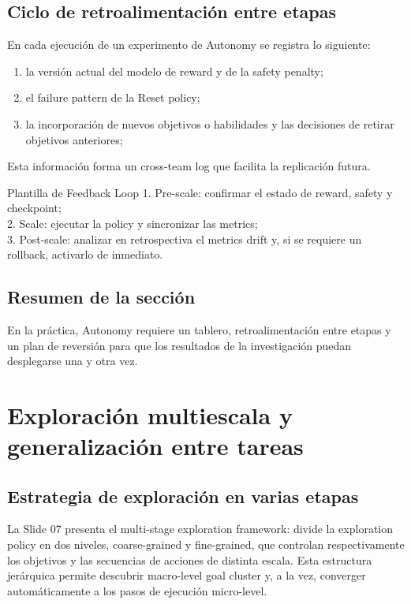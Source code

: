\documentclass[a4paper]{article}
\begin{document}
\subsection{Ciclo de retroalimentación entre etapas}
En cada ejecución de un experimento de Autonomy se registra lo siguiente:
\begin{enumerate}
\item la versión actual del modelo de reward y de la safety penalty;
\item el failure pattern de la Reset policy;
\item la incorporación de nuevos objetivos o habilidades y las decisiones de retirar objetivos anteriores;
\end{enumerate}
Esta información forma un cross-team log que facilita la replicación futura.

\begin{knowledgebox}{Plantilla de Feedback Loop}
1. Pre-scale: confirmar el estado de reward, safety y checkpoint;\\
2. Scale: ejecutar la policy y sincronizar las metrics;\\
3. Post-scale: analizar en retrospectiva el metrics drift y, si se requiere un rollback, activarlo de inmediato.
\end{knowledgebox}

\subsection{Resumen de la sección}
En la práctica, Autonomy requiere un tablero, retroalimentación entre etapas y un plan de reversión para que los resultados de la investigación puedan desplegarse una y otra vez.
\newpage
\section{Exploración multiescala y generalización entre tareas}
\subsection{Estrategia de exploración en varias etapas}
La Slide 07 presenta el multi-stage exploration framework: divide la exploration policy en dos niveles, coarse-grained y fine-grained, que controlan respectivamente los objetivos y las secuencias de acciones de distinta escala. Esta estructura jerárquica permite descubrir macro-level goal cluster y, a la vez, converger automáticamente a los pasos de ejecución micro-level.
\end{document}

